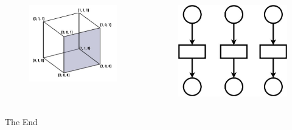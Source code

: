 \documentclass{beamer}
\begin{document}
\begin{frame}
\begin{columns}[c]
\begin{figure}
\includegraphics[width=1.5\linewidth,height=\textheight,keepaspectratio,right]{CubeVertices.jpg}
\end{figure}

\begin{figure}
\includegraphics[width=1.2\linewidth,height=\textheight,keepaspectratio,right]{unfolding.jpg}
\end{figure}
\end{columns}
\end{frame}


\begin{frame}
\Huge{\centerline{The End}}
\end{frame}

\end{document}
